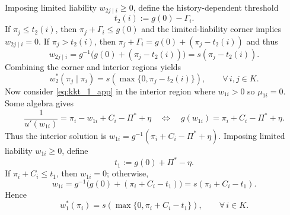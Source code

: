 \documentclass[12pt]{article}
\theoremstyle{definition}
\begin{document}
Imposing limited liability \(w_{2j\mid i}\ge 0\), define the history-dependent threshold
\begin{equation}\label{eq:t2_def_general}
t_2(i):=g(0)-\Gamma_i.
\end{equation}
If \(\pi_j\le t_2(i)\), then \(\pi_j+\Gamma_i\le g(0)\) and the limited-liability corner implies \(w_{2j\mid i}=0\). If \(\pi_j>t_2(i)\), then
\(\pi_j+\Gamma_i=g(0)+(\pi_j-t_2(i))\) and thus
\[
w_{2j\mid i}=g^{-1}\!\big(g(0)+(\pi_j-t_2(i))\big)=s(\pi_j-t_2(i)).
\]
Combining the corner and interior regions yields
\begin{equation}\label{eq:w2_general_derived}
w_2^*(\pi_j\mid \pi_i)=s\!\left(\max\{0,\pi_j-t_2(i)\}\right),
\qquad \forall\, i,j\in K.
\end{equation}
Now consider \eqref{eq:kkt_1_app} in the interior region where \(w_{1i}>0\) so \(\mu_{1i}=0\). Some algebra gives
\[
\frac{1}{u'(w_{1i})}=\pi_i-w_{1i}+C_i-\Pi^*+\eta
\quad\Longleftrightarrow\quad
g(w_{1i})=\pi_i+C_i-\Pi^*+\eta.
\]
Thus the interior solution is \(w_{1i}=g^{-1}(\pi_i+C_i-\Pi^*+\eta)\). Imposing limited liability \(w_{1i}\ge 0\), define
\begin{equation}\label{eq:t1_def_general}
t_1:=g(0)+\Pi^*-\eta.
\end{equation}
If \(\pi_i+C_i\le t_1\), then \(w_{1i}=0\); otherwise,
\[
w_{1i}=g^{-1}\!\big(g(0)+(\pi_i+C_i-t_1)\big)=s(\pi_i+C_i-t_1).
\]
Hence
\begin{equation}\label{eq:w1_general_derived}
w_1^*(\pi_i)=s\!\left(\max\{0,\pi_i+C_i-t_1\}\right),
\qquad \forall\, i\in K.
\end{equation}


 

\end{document}
